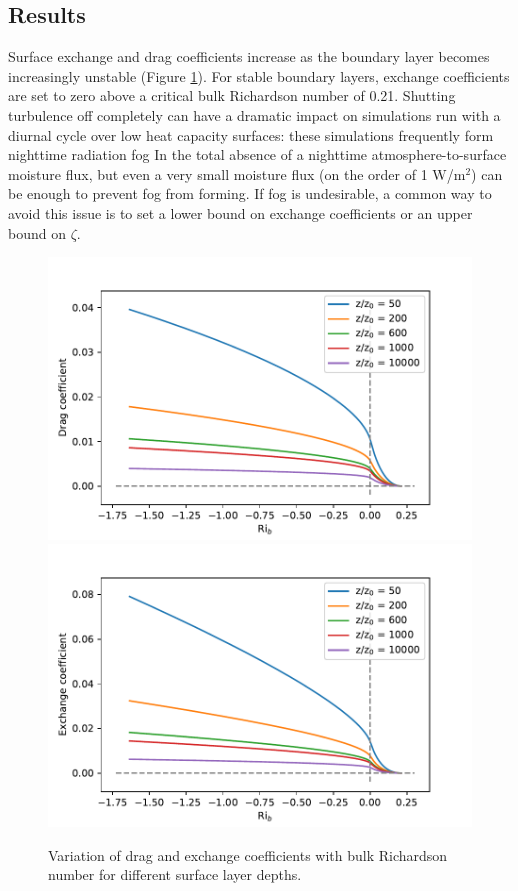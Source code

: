 \documentclass[10pt]{article}
\begin{document}
\subsection{Results}

Surface exchange and drag coefficients increase as the boundary layer becomes increasingly unstable (Figure \ref{fig:Byun4}). For stable boundary layers, exchange coefficients are set to zero above a critical bulk Richardson number of 0.21. Shutting turbulence off completely can have a dramatic impact on simulations run with a diurnal cycle over low heat capacity surfaces: these simulations frequently form nighttime radiation fog In the total absence of a nighttime atmosphere-to-surface moisture flux, but even a very small  moisture flux (on the order of 1 W/m$^2$) can be enough to prevent fog from forming. If fog is undesirable, a common way to avoid this issue is to set a lower bound on exchange coefficients or an upper bound on $\zeta$.

\begin{figure}
\begin{center}
\includegraphics[height=0.4\textheight]{Byun1990Figure4a.pdf}
\includegraphics[height=0.4\textheight]{Byun1990Figure4b.pdf}
\end{center}
\caption{Variation of drag and exchange coefficients with bulk Richardson number for different surface layer depths.}
\label{fig:Byun4}
\end{figure}
\end{document}
